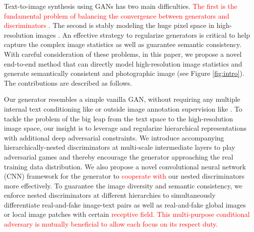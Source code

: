 \documentclass[10pt,twocolumn,letterpaper]{article}
\begin{document}
Text-to-image synthesis using GANs has two main difficulties. \textcolor{red}{The first is the fundamental problem of balancing the convergence between generators and discriminators \cite{goodfellow2014generative,improvedGAN}.} %
The second is stably modeling the huge pixel space in high-resolution images \cite{han2017stackgan}. 
An effective strategy to regularize generators is critical to help capture the complex image statistics \cite{huang2016stacked} as well as guarantee semantic consistency. 
With careful consideration of these problems, in this paper, we propose a novel end-to-end method that can directly model high-resolution image statistics and generate semantically consistent and photographic image (see Figure \ref{fig:intro}). The contributions are described as follows.

Our generator resembles a simple vanilla GAN, without requiring any multiple internal text conditioning like \cite{han2017stackgan} or outside image annotation supervision like \cite{dash2017tac}. To tackle the problem of the big leap from the text space to the high-resolution image space, our insight is to leverage and regularize hierarchical representations with additional deep adversarial constraints. 
We introduce accompanying hierarchically-nested discriminators at multi-scale intermediate layers to play adversarial games and thereby encourage the generator approaching the real training data distribution. 
We also propose a novel convolutional neural network (CNN) framework for the generator to \textcolor{red}{cooperate with} our nested discriminators more effectively.
To guarantee the image diversity and semantic consistency,
we enforce nested discriminators at different hierarchies to simultaneously differentiate real-and-fake image-text pairs as well as real-and-fake global images or local image patches with certain \textcolor{red}{receptive field. This multi-purpose conditional adversary is mutually beneficial to allow each focus on its respect duty.}%
\end{document}
